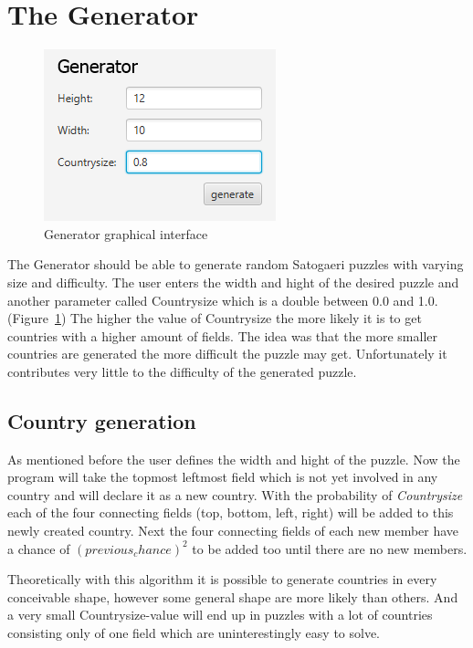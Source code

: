 \documentclass[a4paper,10pt]{paper}
\begin{document}
\section{The Generator}
\begin{figure}
  \centering
  \includegraphics[scale=1]{Pictures/generator.png} 
  \caption{Generator graphical interface}
  \label{fig:generator}
\end{figure}
The Generator should be able to generate random Satogaeri puzzles with varying size and difficulty. The user enters the width and hight of the desired puzzle and another parameter called Countrysize which is a double between 0.0 and 1.0. (Figure~\ref{fig:generator}) The higher the value of Countrysize the more likely it is to get countries with a higher amount of fields. The idea was that the more smaller countries are generated the more difficult the puzzle may get. Unfortunately it contributes very little to the difficulty of the generated puzzle.

\subsection{Country generation}
As mentioned before the user defines the width and hight of the puzzle. Now the program will take the topmost leftmost field which is not yet involved in any country and will declare it as a new country. With the probability of \emph{Countrysize} each of the four connecting fields (top, bottom, left, right) will be added to this newly created country. Next the four connecting fields of each new member have a chance of \emph{\((previous_chance)^2\)} to be added too until there are no new members.

Theoretically with this algorithm it is possible to generate countries in every conceivable shape, however some general shape are more likely than others. And a very small Countrysize-value will end up in puzzles with a lot of countries consisting only of one field which are uninterestingly easy to solve.
\end{document}
